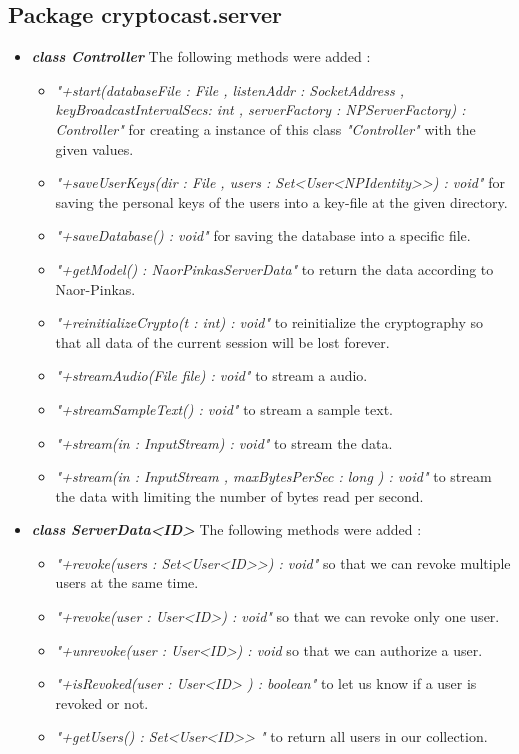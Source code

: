 \documentclass[a4paper,10pt]{scrartcl}
\begin{document}
\subsection{Package cryptocast.server}

\begin{itemize}
  
	\item \textbf{\textit{class Controller}} \newline
	The following methods were added :
	\begin{itemize}
	 \item \textit{"+start(databaseFile : File , listenAddr : SocketAddress , keyBroadcastIntervalSecs: int ,
	 serverFactory : NPServerFactory) : Controller"} for creating a instance of this class 
	 \textit{"Controller"} with the given values.
	 \item \textit{"+saveUserKeys(dir : File , users : Set<User<NPIdentity>>) : void"} for saving
	 the personal keys of the users into a key-file at the given directory.
	 \item \textit{"+saveDatabase() : void"} for saving the database into a specific file.
	 \item \textit{"+getModel() : NaorPinkasServerData"} to return the data according to Naor-Pinkas.
	 \item \textit{"+reinitializeCrypto(t : int) : void"} to reinitialize the cryptography so that 
	 all data of the current session will be lost forever.
	 \item \textit{"+streamAudio(File file) : void"} to stream a audio.
	 \item \textit{"+streamSampleText() : void"} to stream a sample text.
	 \item \textit{"+stream(in : InputStream) : void"} to stream the data.
	 \item \textit{"+stream(in : InputStream , maxBytesPerSec : long ) : void"} to stream the data with limiting 
	 the number of bytes read per second.
	\end{itemize}
	
	\item \textbf{\textit{class ServerData<ID>}}\newline
	The following methods were added :
  \begin{itemize}
	 \item \textit{"+revoke(users : Set<User<ID>>) : void"} so that we can revoke multiple users at the same time.
	 \item \textit{"+revoke(user : User<ID>) : void"} so that we can revoke only one user.
	 \item \textit{"+unrevoke(user : User<ID>) : void} so that we can authorize a user.
	 \item \textit{"+isRevoked(user : User<ID> ) : boolean"} to let us know if a user is revoked or not.
	 \item \textit{"+getUsers() : Set<User<ID>> "} to return all users in our collection.
	\end{itemize}


\end{itemize}
\end{document}
